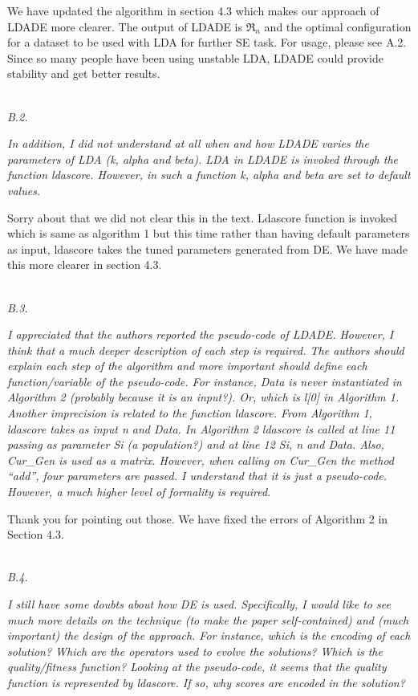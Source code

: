 \documentclass[conference]{IEEEtran}
\begin{document}
We have updated the algorithm in section 4.3 which makes our approach of LDADE more clearer. The output of LDADE is $\Re_n$ and the optimal configuration for a dataset to be used with LDA for further SE task. For usage, please see A.2. Since so many people have been using unstable LDA, LDADE could provide stability and get better results.

\noindent
\textit{\\B.2.}  

\textit{In addition, I did not understand at all when and how LDADE varies the parameters of LDA (k, alpha and beta). LDA in LDADE is invoked through the function ldascore. However, in such a function k, alpha and beta are set to default values.\\}

Sorry about that we did not clear this in the text. Ldascore function is invoked which is same as algorithm 1 but this time rather than having default parameters as input, ldascore takes the tuned parameters generated from DE. We have made this more clearer in section 4.3.

\noindent
\textit{\\B.3.} 

\textit{I appreciated that the authors reported the pseudo-code of LDADE. However, I think that a much deeper description of each step is required. The authors should explain each step of the algorithm and more important should define each function/variable of the pseudo-code. For instance, Data is never instantiated in Algorithm 2 (probably because it is an input?). Or, which is l[0] in Algorithm 1. Another imprecision is related to the function ldascore. From Algorithm 1, ldascore takes as input n and Data. In Algorithm 2 ldascore is called at line 11 passing as parameter Si (a population?) and at line 12 Si, n and Data. Also, Cur\_Gen is used as a matrix. However, when calling on Cur\_Gen the method ``add'', four parameters are passed. I understand that it is just a pseudo-code. However, a much higher level of formality is required.\\}

Thank you for pointing out those. We have fixed the errors of Algorithm 2 in Section 4.3. 

\noindent
\textit{\\B.4.} 

\textit{I still have some doubts about how DE is used. Specifically, I would like to see much more details on the technique (to make the paper self-contained) and (much important) the design of the approach. For instance, which is the encoding of each solution? Which are the operators used to evolve the solutions? Which is the quality/fitness function? Looking at the pseudo-code, it seems that the quality function is represented by ldascore. If so, why scores are encoded in the solution?\\} 
\end{document}
